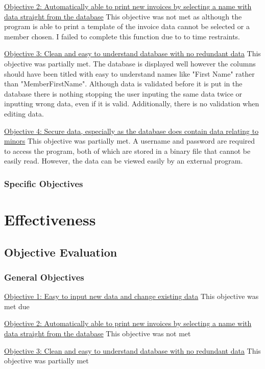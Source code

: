 \underline{Objective 2: Automatically able to print new invoices by selecting a name with data straight from the database}
This objective was not met as although the program is able to print a template of the invoice data cannot be selected or a member chosen. I failed to complete this function due to to time restraints.

\underline{Objective 3: Clean and easy to understand database with no redundant data}
This objective was partially met. The database is displayed well however the columns should have been titled with easy to understand names like "First Name" rather than "MemberFirstName". Although data is validated before it is put in the database there is nothing stopping the user inputing the same data twice or inputting wrong data, even if it is valid. Additionally, there is no validation when editing data.

\underline{Objective 4: Secure data, especially as the database does contain data relating to minors}
This objective was partially met. A username and password are required to access the program, both of which are stored in a binary file that cannot be easily read. However, the data can be viewed easily by an external program.

\subsubsection{Specific Objectives}


\section{Effectiveness}

\subsection{Objective Evaluation}

\subsubsection{General Objectives}
\underline{Objective 1: Easy to input new data and change existing data}
This objective was met due

\underline{Objective 2: Automatically able to print new invoices by selecting a name with data straight from the database}
This objective was not met

\underline{Objective 3: Clean and easy to understand database with no redundant data}
This objective was partially met

